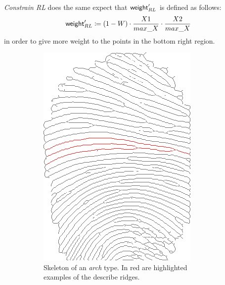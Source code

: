 \documentclass[8pt]{article}
\begin{document}
\emph{Constrain RL} does the same expect that $\textsf{weight}_{RL}^\prime$ is
defined as follows:
  \begin{align*}
    \textsf{weight}_{RL}^\prime \coloneqq 
      (1-W)\cdot \frac{X1}{max\_X} \cdot \frac{X2}{max\_X}
  \end{align*}
in order to give more weight to the points in the bottom right region.
\begin{figure}
	\centering
   	\begin{subfigure}{.48\textwidth}
   			\centering
	\includegraphics[width=0.9\linewidth]{img/arch}
	\caption{Skeleton of an \textit{arch} type. In red are highlighted examples of the describe ridges.}
	\label{fig:arch}
\end{subfigure}%
\hfill
\begin{subfigure}{.48\textwidth}
	\centering

\end{subfigure}
\end{figure}
\end{document}
